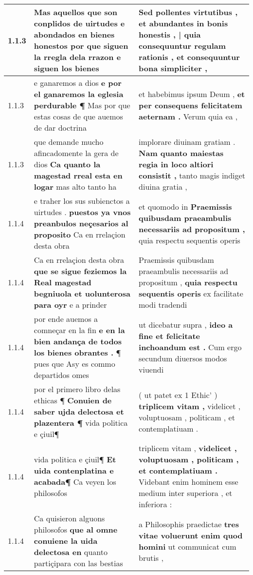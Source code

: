 \begin{tabular}{|p{1cm}|p{6.5cm}|p{6.5cm}|}
1.1.3 & Mas aquellos que son conplidos de uirtudes \textbf{ e abondados en bienes honestos por que siguen la rregla dela rrazon } e siguen los bienes & Sed pollentes virtutibus , \textbf{ et abundantes in bonis honestis , | quia consequuntur regulam rationis , } et consequuntur bona simpliciter , \\\hline
1.1.3 & e ganaremos a dios \textbf{ e por el ganaremos la eglesia perdurable ¶ } Mas por que estas cosas de que auemos de dar doctrina & et habebimus ipsum Deum , \textbf{ et per consequens felicitatem aeternam . } Verum quia ea , \\\hline
1.1.3 & que demande mucho afincadomente la gera de dios \textbf{ Ca quanto la magestad rreal esta en logar } mas alto tanto ha & implorare diuinam gratiam . \textbf{ Nam quanto maiestas regia in loco altiori consistit , } tanto magis indiget diuina gratia , \\\hline
1.1.4 & e traher los sus subienctos a uirtudes . \textbf{ puestos ya vnos preanbulos neçesarios al proposito } Ca en rrelaçion desta obra & et quomodo in \textbf{ Praemissis quibusdam praeambulis necessariis ad propositum , } quia respectu sequentis operis \\\hline
1.1.4 & Ca en rrelaçion desta obra \textbf{ que se sigue feziemos la Real magestad begniuola et uolunterosa para oyr } e a prinder & Praemissis quibusdam praeambulis necessariis ad propositum , \textbf{ quia respectu sequentis operis } ex facilitate modi tradendi \\\hline
1.1.4 & por ende auemos a comneçar en la fin \textbf{ e en la bien andança de todos los bienes obrantes . } ¶ pues que Asy es commo departidos omes & ut dicebatur supra , \textbf{ ideo a fine et felicitate inchoandum est . } Cum ergo secundum diuersos modos viuendi \\\hline
1.1.4 & por el primero libro delas ethicas ¶ \textbf{ Conuien de saber ujda delectosa et plazentera ¶ } vida politica e çiuil¶ & ( ut patet ex 1 Ethic’ ) \textbf{ triplicem vitam , } videlicet , voluptuosam , politicam , et contemplatiuam . \\\hline
1.1.4 & vida politica e çiuil¶ \textbf{ Et uida contenplatina e acabada¶ } Ca veyen los philosofos & triplicem vitam , \textbf{ videlicet , voluptuosam , politicam , et contemplatiuam . } Videbant enim hominem esse medium inter superiora , et inferiora : \\\hline
1.1.4 & Ca quisieron alguons philosofos \textbf{ que al omne conuiene la uida delectosa en } quanto partiçipara con las bestias & a Philosophis praedictae \textbf{ tres vitae voluerunt enim quod homini } ut communicat cum brutis , \\\hline

\end{tabular}
